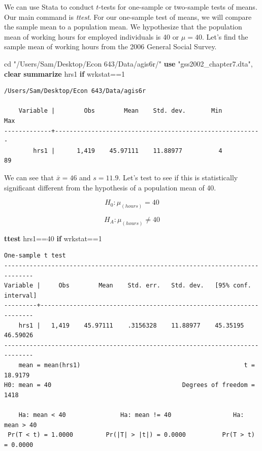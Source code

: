\documentclass[
]{book}
\newenvironment{Shaded}{\begin{snugshade}}{\end{snugshade}}
\newcommand{\KeywordTok}[1]{\textcolor[rgb]{0.13,0.29,0.53}{\textbf{#1}}}
\newcommand{\NormalTok}[1]{#1}
\newcommand{\StringTok}[1]{\textcolor[rgb]{0.31,0.60,0.02}{#1}}
\begin{document}
We can use Stata to conduct \(t\)-tests for one-sample or two-sample tests of means. Our main command is \emph{ttest}. For our one-sample test of means, we will compare the sample mean to a population mean. We hypothesize that the population mean of working hours for employed individuals is 40 or \(\mu=40\). Let's find the sample mean of working hours from the 2006 General Social Survey.

\begin{Shaded}
\begin{Highlighting}[]
\NormalTok{cd }\StringTok{"/Users/Sam/Desktop/Econ 643/Data/agis6r/"}
\KeywordTok{use} \StringTok{"gss2002\_chapter7.dta"}\NormalTok{, }\KeywordTok{clear}
\KeywordTok{summarize}\NormalTok{ hrs1 }\KeywordTok{if}\NormalTok{ wrkstat==1}
\end{Highlighting}
\end{Shaded}

\begin{verbatim}
/Users/Sam/Desktop/Econ 643/Data/agis6r

    Variable |        Obs        Mean    Std. dev.       Min        Max
-------------+---------------------------------------------------------
        hrs1 |      1,419    45.97111    11.88977          4         89
\end{verbatim}

We can see that \(\bar{x} = 46\) and \(s = 11.9\). Let's test to see if this is statistically significant different from the hypothesis of a population mean of 40.

\[ H_{0}: \mu_{(hours)}=40 \]

\[ H_{A}: \mu_{(hours)} \neq 40 \]

\begin{Shaded}
\begin{Highlighting}[]
\KeywordTok{ttest}\NormalTok{ hrs1==40 }\KeywordTok{if}\NormalTok{ wrkstat==1}
\end{Highlighting}
\end{Shaded}

\begin{verbatim}
One-sample t test
------------------------------------------------------------------------------
Variable |     Obs        Mean    Std. err.   Std. dev.   [95% conf. interval]
---------+--------------------------------------------------------------------
    hrs1 |   1,419    45.97111    .3156328    11.88977    45.35195    46.59026
------------------------------------------------------------------------------
    mean = mean(hrs1)                                             t =  18.9179
H0: mean = 40                                    Degrees of freedom =     1418

    Ha: mean < 40               Ha: mean != 40                 Ha: mean > 40
 Pr(T < t) = 1.0000         Pr(|T| > |t|) = 0.0000          Pr(T > t) = 0.0000
\end{verbatim}
\end{document}
